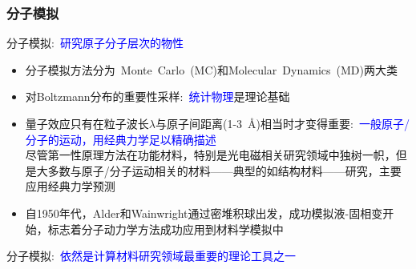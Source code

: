\small
\frame
{
	\frametitle{分子模拟}
	分子模拟:~\textcolor{blue}{研究原子分子层次的物性}
	\begin{itemize}
		\item 分子模拟方法分为~\textrm{Monte~Carlo~(MC)}和\textrm{Molecular~Dynamics~(MD)}两大类
		\item 对\textrm{Boltzmann}分布的重要性采样:~\textcolor{blue}{统计物理}是理论基础
	\end{itemize}
	\begin{itemize}
		\item 量子效应只有在粒子波长$\lambda$与原子间距离\textrm{(1-3~\AA)}相当时才变得重要:~\textcolor{blue}{一般原子/分子的运动，用经典力学足以精确描述}\\
			尽管第一性原理方法在功能材料，特别是光电磁相关研究领域中独树一帜，但是大多数与原子/分子运动相关的材料——典型的如结构材料——研究，主要应用经典力学预测%
		\item 自\textrm{1950}年代，\textrm{Alder}和\textrm{Wainwright}通过密堆积球出发，成功模拟液-固相变开始，标志着分子动力学方法成功应用到材料学模拟中
	\end{itemize}
	分子模拟:~\textcolor{blue}{依然是计算材料研究领域最重要的理论工具之一}
}

